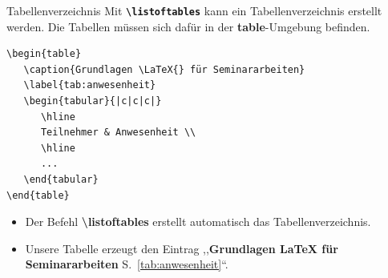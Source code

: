



\begin{frame}[fragile]{Tabellenverzeichnis}
Mit \textbf{\texttt{\textbackslash listoftables}} kann ein Tabellenverzeichnis erstellt werden.
Die Tabellen müssen sich dafür in der \textbf{table}-Umgebung befinden.

\begin{lstlisting}[style=tex]
\begin{table}
   \caption{Grundlagen \LaTeX{} für Seminararbeiten}
   \label{tab:anwesenheit}
   \begin{tabular}{|c|c|c|}
      \hline
      Teilnehmer & Anwesenheit \\
      \hline 
      ...   
   \end{tabular}
\end{table}
\end{lstlisting}\label{tab:anwesenheit}%

\begin{itemize}
\item Der Befehl \textbf{\textbackslash listoftables} erstellt automatisch das Tabellenverzeichnis.
\item Unsere Tabelle erzeugt den Eintrag ,,\textbf{Grundlagen \LaTeX{} für Seminararbeiten} S.~\ref{tab:anwesenheit}``.
\end{itemize}
\end{frame}

